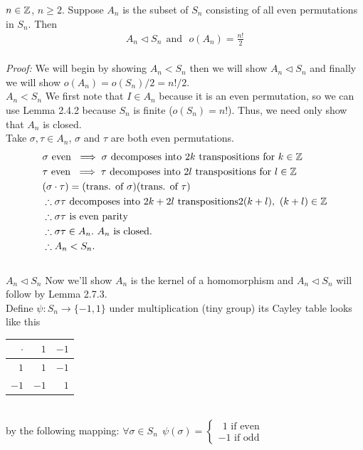 \begin{lemma}
$n\in {\mathbb{ Z}}$, $n\geq 2$. Suppose $A_n$ is the subset of $S_n$ consisting of all even permutations in $S_n$. Then
\begin{align}
    A_n \triangleleft S_n \ \ \text{and} \ \ \  o(A_n)=\frac{n!}{2}\nonumber
\end{align} \\
\noindent \textit{Proof:} We will begin by showing $A_n < S_n$ then we will show $A_n\triangleleft S_n$ and finally we will show $o(A_n)=o(S_n)/2 = n!/2$. \steezybreak\\
$\boxed{A_n < S_n}$ We first note that $I\in A_n$ because it is an even permutation, so we can use Lemma 2.4.2 because $S_n$ is finite ($o(S_n)=n!$). Thus, we need only show that $A_n$ is closed. \steezybreak \\ 
Take $\sigma, \tau \in A_n$, $\sigma$ and $\tau$ are both even permutations.
\begin{align}
    &\sigma \text{ even }\implies \sigma \text{ decomposes into }2k \text{ transpositions for } k\in {\mathbb{ Z}} \nonumber \\
    &\tau \text{ even }\implies \tau \text{ decomposes into }2l \text{ transpositions for } l\in {\mathbb{ Z}} \nonumber \\
    &(\sigma \cdot \tau) = (\text{trans. of }\sigma)(\text{trans. of }\tau)\nonumber \\
    &\therefore \sigma\tau \text{ decomposes into }2k+2l \text{ transpositions} 2(k+l), \ (k+l)\in {\mathbb{ Z}} \nonumber \\
    &\therefore \sigma \tau \text{ is even parity} \nonumber \\
    &\therefore \sigma \tau \in A_n. \ A_n\text{ is closed.} \nonumber \\
    &\therefore A_n < S_n. \nonumber
\end{align}\\
\noindent $\boxed{A_n \triangleleft S_n}$ Now we'll show $A_n$ is the kernel of a homomorphism and $A_n \triangleleft S_n$ will follow by Lemma 2.7.3. \steezybreak\\
Define $\psi : S_n \rightarrow \{-1,1\} \text{ under multiplication}$ (tiny group) its Cayley table looks like this 
\begin{tabular}{r|rr}
$\cdot$ & $1$  & $-1$ \\ \hline
$1$     & $1$  & $-1$ \\
$-1$    & $-1$ & $1$ 
\end{tabular}\\
by the following mapping: $\forall \sigma \in S_n \ \ \psi(\sigma)= \begin{cases}
  \ \ 1 \text{ if even} \\
  -1\text{ if odd}
\end{cases}$\\


\end{lemma}
